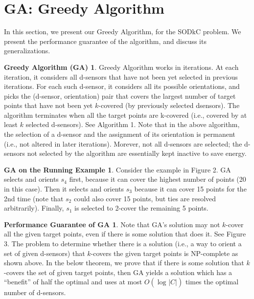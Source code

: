 \documentclass[conference]{IEEEtran}
\theoremstyle{definition}
\newtheorem*{NP-Hardness of Approximating the SODkC Problem}{NP-Hardness of Approximating the SODkC Problem}
\newtheorem*{Greedy Algorithm (GA)}{Greedy Algorithm (GA)}
\newtheorem*{GA on the Running Example}{GA on the Running Example}
\newtheorem*{Performance Guarantee of GA}{Performance Guarantee of GA}
\begin{document}
\section{GA: Greedy Algorithm}
In this section, we present our Greedy Algorithm, for the SODkC problem. We present the performance guarantee of the algorithm, and discuss its generalizations.

\begin{Greedy Algorithm (GA)}
Greedy Algorithm works in iterations. At each iteration, it considers all d-sensors that have not been yet selected in previous iterations. For each such d-sensor, it considers all its possible orientations, and picks the (d-sensor, orientation) pair that covers the largest number of target points that have not been yet $k$-covered (by previously selected dsensors). The algorithm terminates when all the target points are k-covered (i.e., covered by at least $k$ selected d-sensors). See Algorithm 1. Note that in the above algorithm, the selection of a d-sensor and the assignment of its orientation is permanent (i.e., not altered in later iterations). Morever, not all d-sensors are selected; the d-sensors not selected by the algorithm are essentially kept inactive to save energy.
\end{Greedy Algorithm (GA)}

\begin{GA on the Running Example}
Consider the example in Figure 2. GA selects and orients $s_4$ first, because it can cover the highest number of points (20 in this case). Then it selects and orients $s_3$ because it can cover 15 points for the 2nd time (note that $s_2$ could also cover 15 points, but ties are resolved arbitrarily). Finally, $s_1$ is selected to 2-cover the remaining 5 points.
\end{GA on the Running Example}

\begin{Performance Guarantee of GA}
Note that GA’s solution may not $k$-cover all the given target points, even if there is some solution that does it. See Figure 3. The problem to determine whether there is a solution (i.e., a way to orient a set of given d-sensors) that $k$-covers the given target points is NP-complete as shown above. In the below theorem, we prove that if there is some solution that $k$-covers the set of given target points, then GA yields a solution which has a “benefit” of half the optimal and uses at most $O(\log_{}|C|)$ times the optimal number of d-sensors.
\end{Performance Guarantee of GA}
\end{document}

